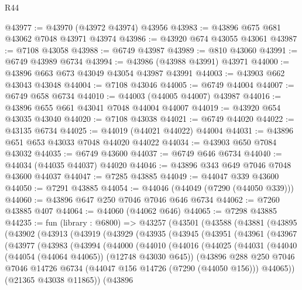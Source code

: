 \begin{lexlean}{R44}
\begin{coremodule}
{@43977 := @43970 (@43972 @43974) @43956
@43983 := @43896 @675 @681 @43062 @7048 @43971 @43974
@43986 := @43920 @674 @43055 @43061
@43987 := @7108 @43058
@43988 := @6749 @43987
@43989 := @810 @43060
@43991 := @6749 @43989 @6734
@43994 := @43986 (@43988 @43991) @43971
@44000 := @43896 @663 @673 @43049 @43054 @43987 @43991
@44003 := @43903 @662 @43043 @43048
@44004 := @7108 @43046
@44005 := @6749 @44004
@44007 := @6749 @658 @6734
@44010 := @44003 (@44005 @44007) @43987
@44016 := @43896 @655 @661 @43041 @7048 @44004 @44007
@44019 := @43920 @654 @43035 @43040
@44020 := @7108 @43038
@44021 := @6749 @44020
@44022 := @43135 @6734
@44025 := @44019 (@44021 @44022) @44004
@44031 := @43896 @651 @653 @43033 @7048 @44020 @44022
@44034 := @43903 @650 @7084 @43032
@44035 := @6749 @43600
@44037 := @6749 @646 @6734
@44040 := @44034 (@44035 @44037) @44020
@44046 := @43896 @343 @649 @7046 @7048 @43600 @44037
@44047 := @7285 @43885
@44049 := @44047 @339 @43600
@44050 := @7291 @43885
@44054 := @44046 (@44049 (@7290 (@44050 @339)))
@44060 := @43896 @647 @250 @7046 @7046 @646 @6734
@44062 := @7260 @43885 @407
@44064 := @44060 (@44062 @646)
@44065 := @7298 @43885
@44235 := fun (library : @6800) =>
  @43257
    (@43501
      (@43588
        (@43881
          (@43895
            (@43902
              (@43913
                (@43919
                  (@43929
                    (@43935
                      (@43945
                        (@43951
                          (@43961
                            (@43967
                              (@43977
                                (@43983
                                  (@43994
                                    (@44000
                                      (@44010
                                        (@44016
                                          (@44025
                                            (@44031
                                              (@44040 (@44054 (@44064 @44065)) (@12748 @43030 @645))
                                              (@43896
                                                @288
                                                @250
                                                @7046
                                                @7046
                                                @14726
                                                @6734
                                                (@44047 @156 @14726 (@7290 (@44050 @156)))
                                                @44065))
                                            (@21365 @43038 @11865))
                                          (@43896
}
\end{coremodule}
\end{lexlean}
